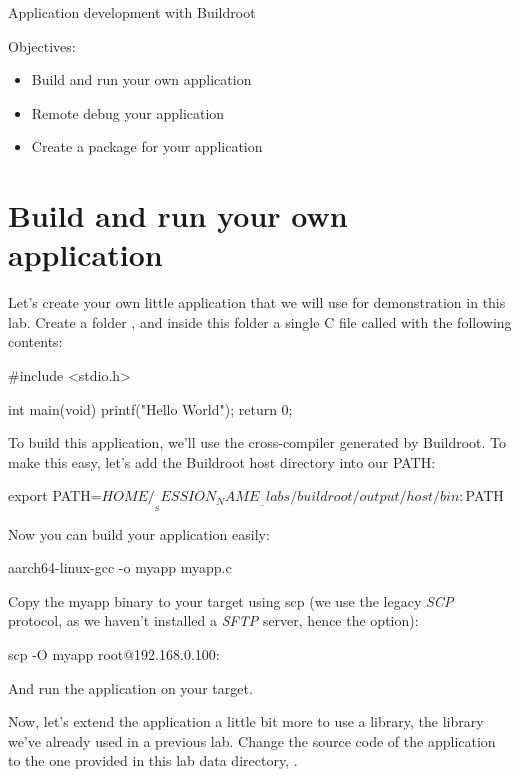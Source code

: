 \subchapter
{Application development with Buildroot}
{Objectives:
  \begin{itemize}
  \item Build and run your own application
  \item Remote debug your application
  \item Create a package for your application
  \end{itemize}
}

\section{Build and run your own application}

Let's create your own little application that we will use for
demonstration in this lab. Create a folder ,
and inside this folder a single C file called  with the
following contents:

\begin{fileinput}
#include <stdio.h>

int main(void) {
        printf("Hello World\n");
        return 0;
}
\end{fileinput}

To build this application, we'll use the cross-compiler generated by
Buildroot. To make this easy, let's add the Buildroot host directory
into our PATH:

\begin{bashinput}
export PATH=$HOME/__SESSION_NAME__-labs/buildroot/output/host/bin:$PATH
\end{bashinput}

Now you can build your application easily:

\begin{bashinput}
aarch64-linux-gcc -o myapp myapp.c
\end{bashinput}

Copy the myapp binary to your target using scp (we use the legacy {\em
SCP} protocol, as we haven't installed a {\em SFTP} server, hence
the  option):

\begin{bashinput}
scp -O myapp root@192.168.0.100:
\end{bashinput}

And run the  application on your target.

Now, let's extend the application a little bit more to use a library,
the  library we've already used in a previous
lab. Change the source code of the application to the one provided in
this lab data directory, .

